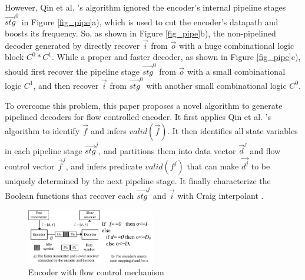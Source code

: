 \documentclass[conference]{IEEEtran}
\begin{document}
However,
Qin et al. \cite{QinTODAES15}'s algorithm ignored the encoder's internal pipeline stages $\vec{stg}^0$ in Figure \ref{fig_pipe}a),
which is used to cut the encoder's datapath and boosts its frequency.
So,
as shown in Figure \ref{fig_pipe}b),
the non-pipelined decoder generated by \cite{QinTODAES15} directly recover $\vec{i}$ from $\vec{o}$ with a huge combinational logic block $C^0*C^1$.
While a proper and faster decoder,
as shown in Figure \ref{fig_pipe}c),
should first recover the pipeline stage $\vec{stg}^0$ from $\vec{o}$ with a small combinational logic $C^1$,
and then recover $\vec{i}$ from $\vec{stg}^0$ with another small combinational logic $C^0$.






To overcome this problem,
this paper proposes a novel algorithm to generate pipelined decoders for flow controlled encoder.
It first applies Qin et al. \cite{QinTODAES15}'s algorithm to identify $\vec{f}$ and infers $valid(\vec{f})$.
It then identifies all state variables in each pipeline stage $\vec{stg}^j$,
and partitions them into data vector $\vec{d}^j$ and flow control vector $\vec{f}^j$,
and infers predicate $valid(f^j)$ that
can make $\vec{d^j}$ to be uniquely determined by the next pipeline stage.
It finally characterize the Boolean functions that recover each $\vec{stg}^j$ and $\vec{i}$ with 
Craig interpolant \cite{InterpBoolFunction}.

\begin{figure}[t]
\centering
\includegraphics[width=0.5\textwidth]{nonuniq}
\caption{Encoder with flow control mechanism}
\label{fig_fc}
\end{figure}
\end{document}
